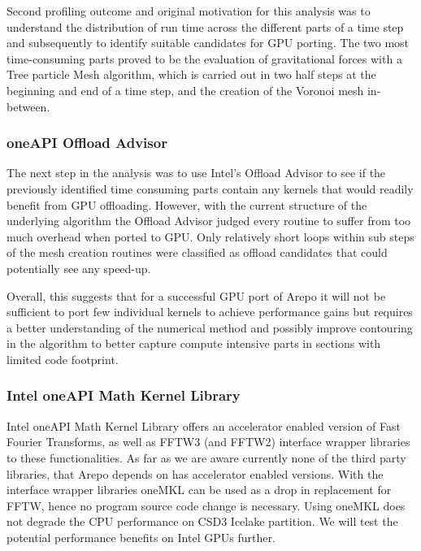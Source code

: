 \documentclass[../main]{subfiles}
\begin{document}
Second profiling outcome and original motivation for this analysis was to understand the distribution of run time across the different parts of a time step and subsequently to identify suitable candidates for GPU porting.
The two most time-consuming parts proved to be the evaluation of gravitational forces with a Tree particle Mesh algorithm, which is carried out in two half steps at the beginning and end of a time step, and the creation of the Voronoi mesh in-between.

\subsubsection{oneAPI Offload Advisor}
The next step in the analysis was to use Intel's Offload Advisor to see if the previously identified time consuming parts contain any kernels that would readily benefit from GPU offloading.
However, with the current structure of the underlying algorithm the Offload Advisor judged every routine to suffer from too much overhead when ported to GPU.
Only relatively short loops within sub steps of the mesh creation routines were classified as offload candidates that could potentially see any speed-up.

Overall, this suggests that for a successful GPU port of Arepo it will not be sufficient to port few individual kernels to achieve performance gains but requires a better understanding of the numerical method and possibly improve contouring in the algorithm to better capture compute intensive parts in sections with limited code footprint.



\subsubsection{Intel oneAPI Math Kernel Library}
Intel oneAPI Math Kernel Library offers an accelerator enabled version of Fast Fourier Transforms, as well as FFTW3 (and FFTW2) interface wrapper libraries to these functionalities.
As far as we are aware currently none of the third party libraries, that Arepo depends on has accelerator enabled versions.
With the interface wrapper libraries oneMKL can be used as a drop in replacement for FFTW, hence no program source code change is necessary.
Using oneMKL does not degrade the CPU performance on CSD3 Icelake partition.
We will test the potential performance benefits on Intel GPUs further.
\end{document}
